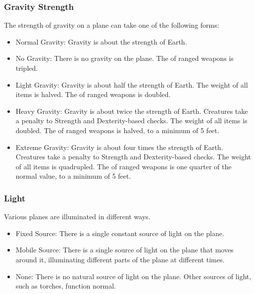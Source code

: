         \subsubsection{Gravity Strength} The strength of gravity on a plane can take one of the following forms:
            \begin{itemize}
                \item Normal Gravity: Gravity is about the strength of Earth.
                \item No Gravity: There is no gravity on the plane.
                    The  of ranged weapons is tripled.
                \item Light Gravity: Gravity is about half the strength of Earth.
                    The weight of all items is halved.
                    The  of ranged weapons is doubled.
                \item Heavy Gravity: Gravity is about twice the strength of Earth.
                    Creatures take a  penalty to Strength and Dexterity-based checks.
                    The weight of all items is doubled.
                    The  of ranged weapons is halved, to a minimum of 5 feet.
                \item Extreme Gravity: Gravity is about four times the strength of Earth.
                    Creatures take a  penalty to Strength and Dexterity-based checks.
                    The weight of all items is quadrupled.
                    The  of ranged weapons is one quarter of the normal value, to a minimum of 5 feet.
            \end{itemize}

        \subsubsection{Light} Various planes are illuminated in different ways.
            \begin{itemize}
                \item Fixed Source: There is a single constant source of light on the plane.
                \item Mobile Source: There is a single source of light on the plane that moves around it, illuminating different parts of the plane at different times.
                \item None: There is no natural source of light on the plane.
                    Other sources of light, such as torches, function normal.
            \end{itemize}

